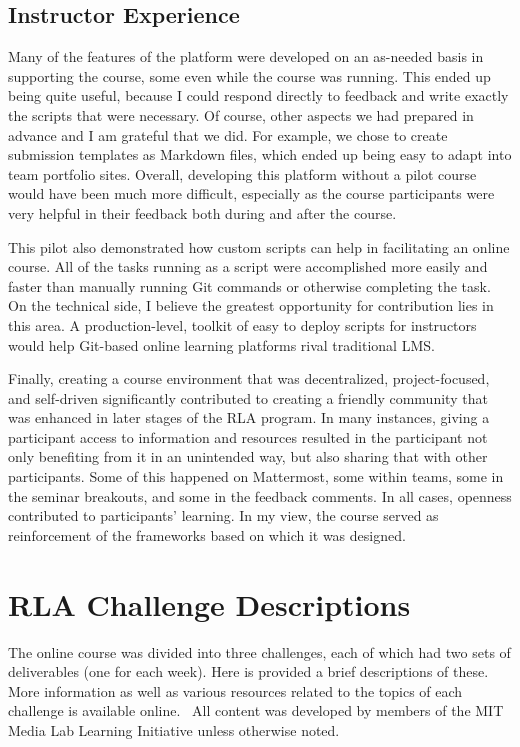 \documentclass[12pt,twoside]{mitthesis}
\begin{document}
\section{Instructor Experience}

Many of the features of the platform were developed on an as-needed basis in supporting the course, some even while the course was running. This ended up being quite useful, because I could respond directly to feedback and write exactly the scripts that were necessary. Of course, other aspects we had prepared in advance and I am grateful that we did. For example, we chose to create submission templates as Markdown files, which ended up being easy to adapt into team portfolio sites. Overall, developing this platform without a pilot course would have been much more difficult, especially as the course participants were very helpful in their feedback both during and after the course.

This pilot also demonstrated how custom scripts can help in facilitating an online course. All of the tasks running as a script were accomplished more easily and faster than manually running Git commands or otherwise completing the task. On the technical side, I believe the greatest opportunity for contribution lies in this area. A production-level, toolkit of easy to deploy scripts for instructors would help Git-based online learning platforms rival traditional LMS.

Finally, creating a course environment that was decentralized, project-focused, and self-driven significantly contributed to creating a friendly community that was enhanced in later stages of the RLA program. In many instances, giving a participant access to information and resources resulted in the participant not only benefiting from it in an unintended way, but also sharing that with other participants. Some of this happened on Mattermost, some within teams, some in the seminar breakouts, and some in the feedback comments. In all cases, openness contributed to participants' learning. In my view, the course served as reinforcement of the frameworks based on which it was designed.

\appendix

\chapter{RLA Challenge Descriptions}

The online course was divided into three challenges, each of which had two sets of deliverables (one for each week). Here is provided a brief descriptions of these. More information as well as various resources related to the topics of each challenge is available online.~\cite{rla} All content was developed by members of the MIT Media Lab Learning Initiative unless otherwise noted.
\end{document}
